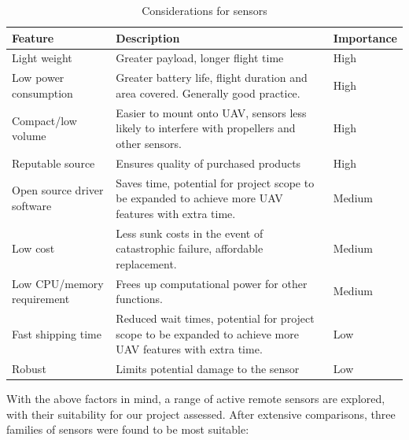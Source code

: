 \documentclass[capstone_report.tex]{subfiles}
\begin{document}
\begin{table}[H]
\centering
\begin{tabular}{lp{6cm}p{3cm}}
\toprule
  Feature                                   & Description & Importance\\ 
\midrule
Light weight                                   & Greater payload, longer flight time & High \\
Low power consumption &	Greater battery life, flight duration and area covered. Generally good practice.	&High\\
Compact/low volume	&Easier to mount onto UAV, sensors less likely to interfere with propellers and other sensors.	&High\\
Reputable source	&Ensures quality of purchased products	&High\\
Open source driver software	&Saves time, potential for project scope to be expanded to achieve more UAV features with extra time.& Medium\\
Low cost	&Less sunk costs in the event of catastrophic failure, affordable replacement.	&Medium\\
Low CPU/memory requirement	&Frees up computational power for other functions.	&Medium\\
Fast shipping time &Reduced wait times, potential for project scope to be expanded to achieve more UAV features with extra time.	&Low\\
Robust	&Limits potential damage to the sensor	&Low \\
\bottomrule
\end{tabular}
\caption{Considerations for sensors\label{tab:sensors}}
\end{table}


With the above factors in mind, a range of active remote sensors are explored, with their suitability for our project assessed. After extensive comparisons, three families of sensors were found to be most suitable:
\end{document}
